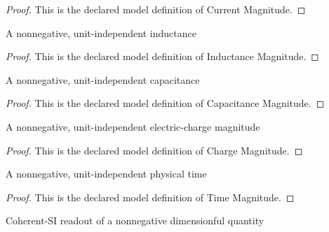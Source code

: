 \begin{proof}
  This is the declared model definition of Current Magnitude.
\end{proof}
\begin{definition}
  \label{def:physics:phyx-mini-0987:phyxminiproblems-problemphyxmini0987-inductancemagnitude}
  A nonnegative, unit-independent inductance
\end{definition}
\begin{proof}
  This is the declared model definition of Inductance Magnitude.
\end{proof}
\begin{definition}
  \label{def:physics:phyx-mini-0987:phyxminiproblems-problemphyxmini0987-capacitancemagnitude}
  A nonnegative, unit-independent capacitance
\end{definition}
\begin{proof}
  This is the declared model definition of Capacitance Magnitude.
\end{proof}
\begin{definition}
  \label{def:physics:phyx-mini-0987:phyxminiproblems-problemphyxmini0987-chargemagnitude}
  A nonnegative, unit-independent electric-charge magnitude
\end{definition}
\begin{proof}
  This is the declared model definition of Charge Magnitude.
\end{proof}
\begin{definition}
  \label{def:physics:phyx-mini-0987:phyxminiproblems-problemphyxmini0987-timemagnitude}
  A nonnegative, unit-independent physical time
\end{definition}
\begin{proof}
  This is the declared model definition of Time Magnitude.
\end{proof}
\begin{definition}
  \label{def:physics:phyx-mini-0987:phyxminiproblems-problemphyxmini0987-nonnegativesireadout}
  Coherent-SI readout of a nonnegative dimensionful quantity
\end{definition}
